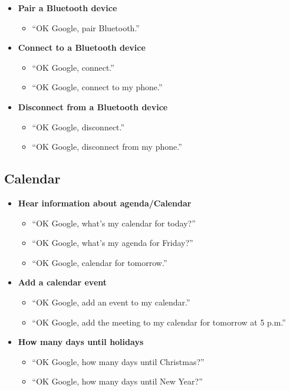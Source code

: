 \documentclass[
  jou,
  floatsintext,
  longtable,
  a4paper,
  nolmodern,
  notxfonts,
  notimes,
  colorlinks=true,linkcolor=blue,citecolor=blue,urlcolor=blue]{apa7}
\providecommand{\tightlist}{%
  \setlength{\itemsep}{0pt}\setlength{\parskip}{0pt}}
\begin{document}
\begin{itemize}
\tightlist
\item
  \textbf{Pair a Bluetooth device}

  \begin{itemize}
  \tightlist
  \item
    ``OK Google, pair Bluetooth.''
  \end{itemize}
\item
  \textbf{Connect to a Bluetooth device}

  \begin{itemize}
  \tightlist
  \item
    ``OK Google, connect.''
  \item
    ``OK Google, connect to my phone.''
  \end{itemize}
\item
  \textbf{Disconnect from a Bluetooth device}

  \begin{itemize}
  \tightlist
  \item
    ``OK Google, disconnect.''
  \item
    ``OK Google, disconnect from my phone.''
  \end{itemize}
\end{itemize}

\subsection{Calendar}\label{calendar}

\begin{itemize}
\tightlist
\item
  \textbf{Hear information about agenda/Calendar}

  \begin{itemize}
  \tightlist
  \item
    ``OK Google, what's my calendar for today?''
  \item
    ``OK Google, what's my agenda for Friday?''
  \item
    ``OK Google, calendar for tomorrow.''
  \end{itemize}
\item
  \textbf{Add a calendar event}

  \begin{itemize}
  \tightlist
  \item
    ``OK Google, add an event to my calendar.''
  \item
    ``OK Google, add the meeting to my calendar for tomorrow at 5 p.m.''
  \end{itemize}
\item
  \textbf{How many days until holidays}

  \begin{itemize}
  \tightlist
  \item
    ``OK Google, how many days until Christmas?''
  \item
    ``OK Google, how many days until New Year?''
  \end{itemize}
\end{itemize}
\end{document}

